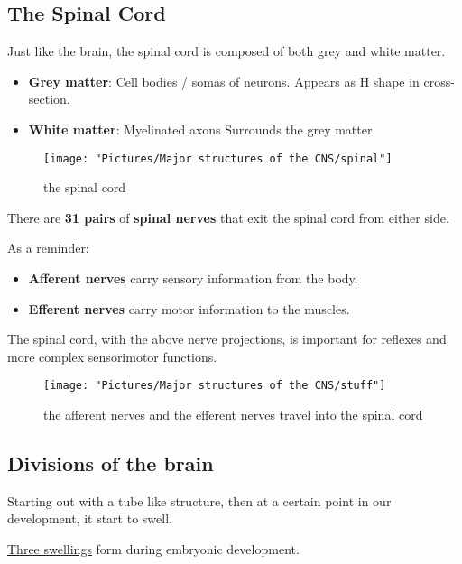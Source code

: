 \documentclass[12pt,a4paper]{article}
\begin{document}
	\subsection{The Spinal Cord}
	
	Just like the brain, the spinal cord is composed of both grey and white matter. 
	
	\begin{itemize}
		\item \textbf{Grey matter}: Cell bodies / somas of neurons.
		\subitem Appears as H shape in cross-section. 
		\item \textbf{White matter}: Myelinated axons
		\subitem Surrounds the grey matter. 
	\end{itemize}
	
		
\begin{figure}
	\centering
	\texttt{[image: "Pictures/Major structures of the CNS/spinal"]}
	\caption{the spinal cord}
	\label{fig:spinal}
\end{figure}

	There are \textbf{31 pairs} of \textbf{spinal nerves} that exit the spinal cord from either side. 
	
	As a reminder:
	\begin{itemize}
		\item \textbf{Afferent nerves} carry sensory information from the body. 
		\item \textbf{Efferent nerves} carry motor information to the muscles. 
	\end{itemize}
	
	The spinal cord, with the above nerve projections, is important for reflexes and more complex sensorimotor functions. 
	
	
\begin{figure}
	\centering
	\texttt{[image: "Pictures/Major structures of the CNS/stuff"]}
	\caption{the afferent nerves and the efferent nerves travel into the spinal cord}
	\label{fig:stuff}
\end{figure}
	
	\subsection{Divisions of the brain}
	
	Starting out with a tube like structure, then at a certain point in our development, it start to swell. 
	
	\underline{Three swellings} form during embryonic development.\\
	
\end{document}
